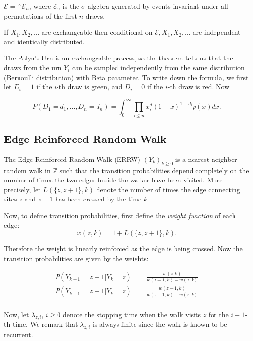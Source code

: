  $\mathcal{E} = \cap \mathcal{E}_n$, where $\mathcal{E}_n$ is the $\sigma$-algebra generated by events invariant under all permutations of the first $n$ draws.

\begin{theorem}
	 If $X_1, X_2, \ldots$ are exchangeable then conditional on $\mathcal{E}, X_1, X_2, \ldots$ are independent and identically distributed.
\end{theorem}

The Polya's Urn is an exchangeable process, so the theorem tells us that the draws from the urn  $Y_i$ can be sampled independently from the same distribution (Bernoulli distribution) with Beta parameter. To write down the formula, we first let $D_i = 1$ if the $i$-th draw is green, and $D_i = 0$ if the $i$-th draw is red. Now
\begin{proposition}
	
\[
	P\left( D_1 = d_1, \ldots, D_n = d_n \right) 
	= \int_0^\infty  \prod_{i \le n} x^d_i (1 - x)^{1 - d_i} p(x) dx
.\] 
\end{proposition}



\subsection{Edge Reinforced Random Walk}

The Edge Reinforced Random Walk (ERRW) $(Y_k)_{k \ge 0}$ is a nearest-neighbor random walk in $\mathbb{Z}$ such that the transition probabilities depend completely on the number of times the two edges beside the walker have been visited. More precisely, let $L(\{z, z+1\} , k)$ denote the number of times the edge connecting sites $z$ and $z+1$ has been crossed by the time $k$.

Now, to define transition probabilities, first define the \textit{weight function} of each edge:
\[
	w(z, k) = 1 + L(\{z, z+1\} , k)
.\] 

Therefore the weight is linearly reinforced as the edge is being crossed. Now the transition probabilities are given by the weights:

\begin{align*}
	P(Y_{k+1} = z+1 | Y_k = z) &= \frac{w(z, k)}{w(z-1, k) + w(z, k)}\\
	P(Y_{k+1} = z-1 | Y_k = z) &= \frac{w(z-1, k)}{w(z-1, k) + w(z, k)}\\
.\end{align*}

Now, let $\lambda_{z, i}$, $i \ge 0$ denote the stopping time when the walk visits $z$ for the $i+1$-th time. We remark that $\lambda_{z, i}$ is always finite since the walk is known to be recurrent.

